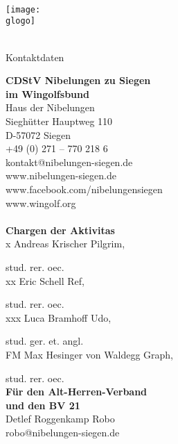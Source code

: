 \newcommand \gvierteSeiteTitel {Kontaktdaten}

\newcommand \gvierteSeite {
	\textbf{CDStV Nibelungen zu Siegen\\im Wingolfsbund}\\
    Haus der Nibelungen\\
	Sieghütter Hauptweg 110\\
	D-57072 Siegen \\
	+49 (0) 271 -- 770 218 6\\
	kontakt@nibelungen-siegen.de\\
	www.nibelungen-siegen.de\\
    www.facebook.com/nibelungensiegen\\
    www.wingolf.org\\
	\\
	\textbf{Chargen der Aktivitas}\\
    \setlength\parindent{24pt}
    x	Andreas Krischer \vulgo Pilgrim,
    \par stud. rer. oec.\\
    xx	Eric Schell \vulgo Ref,
    \par stud. rer. oec.\\
    xxx	Luca Bramhoff \vulgo Udo,
    \par stud. ger. et. angl.\\
    FM	Max Hesinger von Waldegg \vulgo Graph,
    \par stud. rer. oec.
    \setlength\parindent{0pt}
    \\
	\textbf{Für den Alt-Herren-Verband\\und den BV 21}\\
	Detlef Roggenkamp \vulgo Robo\\
	robo@nibelungen-siegen.de\\
} 




\newcommand \lersteSeite {
		
		\gorga \\
		{\fontsize {\gsgL}{\dls} \selectfont \gorgb} \\
		\gorgc \\	
		\texttt{[image: \\glogo]}
		{\fontsize {\gsgL}{\dls} \selectfont \gsempro} \\
		\gsem \\
}

\neueSeite
	{\ohneKopzeile}
	{\zentriert}
	{\ohneTitel}
	{\lersteSeite}	


\neueSeite
	{\mitKopfzeile}
	{\linksbuending}
	{\gzweiteSeiteTitel}
	{\gzweiteSeite}
	

\neueSeite
	{\mitKopfzeile}
	{\linksbuending}
	{\gdritteSeiteTitel}
	{\gdritteSeite}
	

\neueSeite
	{\mitKopfzeile}
	{\linksbuending}
	{\gvierteSeiteTitel}
	{\gvierteSeite}
